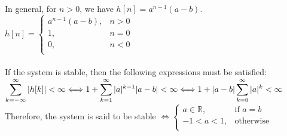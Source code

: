\documentclass[12pt]{article}
\begin{document}
    In general, for \(n > 0\), we have \(h[n] = a^{n-1}(a-b)\).\\
    \begin{math}
      h[n] = \begin{cases}
        a^{n-1}(a-b),& n>0 \\
        1,& n=0\\
        0,& n<0\\
      \end{cases}
    \end{math}\\ \\
    If the system is stable, then the following expressions must be satisfied: \\
    \begin{math}
      \displaystyle\sum_{k = -\infty}^{\infty}|h[k]| < \infty \Longleftrightarrow 1 + \displaystyle\sum_{k = 1}^{\infty}|a|^{k-1}|a-b| < \infty \Longleftrightarrow 1 + |a-b|\displaystyle\sum_{k = 0}^{\infty}|a|^k < \infty\\ \\ 
    \end{math}
    Therefore, the system is said to be stable \begin{math} \Longleftrightarrow \begin{cases}
        a \in \mathbb{R},& \textrm{if }a=b \\
        -1<a<1,& \textrm{otherwise}\\
      \end{cases} \end{math}
\end{document}
